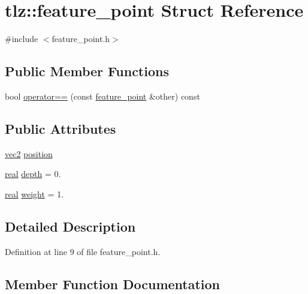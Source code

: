 \hypertarget{structtlz_1_1feature__point}{}\section{tlz\+:\+:feature\+\_\+point Struct Reference}
\label{structtlz_1_1feature__point}


{\ttfamily \#include $<$feature\+\_\+point.\+h$>$}

\subsection*{Public Member Functions}
\begin{DoxyCompactItemize}
\item 
bool \hyperlink{structtlz_1_1feature__point_a3ec9520866358aac2c5c24b3027fbe9d}{operator==} (const \hyperlink{structtlz_1_1feature__point}{feature\+\_\+point} \&other) const 
\end{DoxyCompactItemize}
\subsection*{Public Attributes}
\begin{DoxyCompactItemize}
\item 
\hyperlink{namespacetlz_ae192989bfbe6c700ac84d2a8cf05ebb4}{vec2} \hyperlink{structtlz_1_1feature__point_a841c263a06fece202e68db0144875c16}{position}
\item 
\hyperlink{namespacetlz_a15fd37cce97f2b8b606af18c2615f602}{real} \hyperlink{structtlz_1_1feature__point_a9f2ce2fe87fc8da5ba03f73663889280}{depth} = 0.
\item 
\hyperlink{namespacetlz_a15fd37cce97f2b8b606af18c2615f602}{real} \hyperlink{structtlz_1_1feature__point_a3778df761d42f7fee3265ed996367ebc}{weight} = 1.
\end{DoxyCompactItemize}


\subsection{Detailed Description}


Definition at line 9 of file feature\+\_\+point.\+h.



\subsection{Member Function Documentation}
